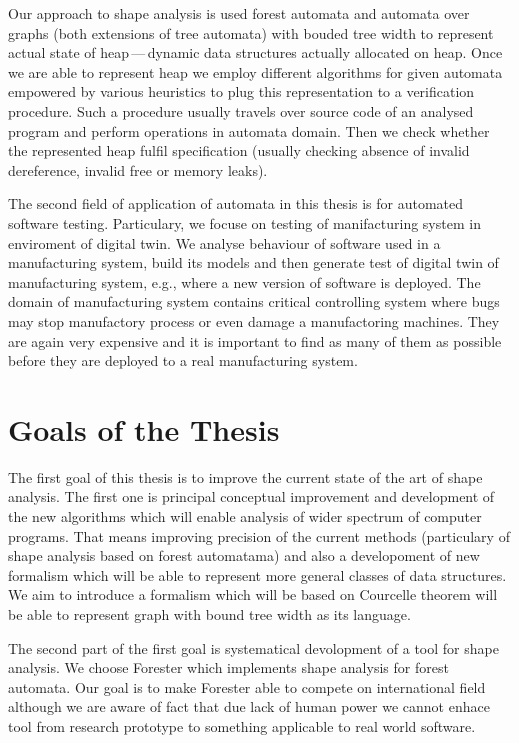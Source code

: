 Our approach to shape analysis is used forest automata and automata over graphs
(both extensions of tree automata) with bouded tree width to represent
actual state of heap\,---\,dynamic data structures actually allocated on heap.
Once we are able to represent heap we employ different algorithms for given automata empowered by
various heuristics to plug this representation to a verification procedure.
Such a procedure usually travels over source code of an analysed program and perform
operations in automata domain.
Then we check whether the represented heap fulfil specification (usually checking
absence of invalid dereference, invalid free or memory leaks).

The second field of application of automata in this thesis is for automated software testing.
Particulary, we focuse on testing of manifacturing system in enviroment of digital twin.
We analyse behaviour of software used in a manufacturing system, build its models and then
generate test of digital twin of manufacturing system, e.g., where a new version of software
is deployed.
The domain of manufacturing system contains critical controlling system where bugs may stop
manufactory process or even damage a manufactoring machines.
They are again very expensive and it is important to find as many of them as possible
before they are deployed to a real manufacturing system.

\section{Goals of the Thesis}
The first goal of this thesis is to improve the current state of the art of shape analysis.
The first one is principal conceptual improvement and development of the new algorithms
which will enable analysis of wider spectrum of computer programs.
That means improving precision of the current methods (particulary of shape analysis based on forest automatama)
and also a developoment of new formalism which will be able to represent
more general classes of data structures.
We aim to introduce a formalism which will be based on Courcelle theorem \cite{Courcelle}
will be able to represent graph with bound tree width as its language.

The second part of the first goal is systematical devolopment of a tool for shape analysis.
We choose Forester \cite{svcompweb} which implements shape analysis for forest automata.
Our goal is to make Forester able to compete on international field although we are
aware of fact that due lack of human power we cannot enhace tool from research prototype
to something applicable to real world software.

